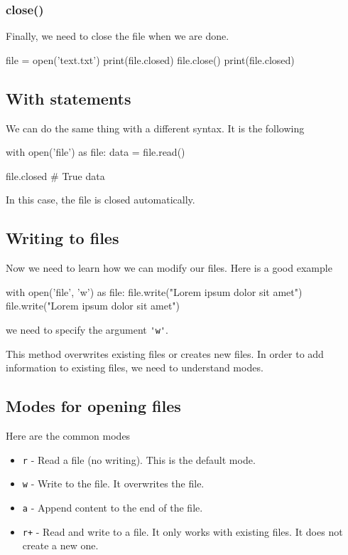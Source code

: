 \subsubsection{close()} Finally, we need to close the file when we are done. 
\begin{listing}{1}
file = open('text.txt')
print(file.closed)
file.close()
print(file.closed)    
\end{listing}

\subsection{With statements}

We can do the same thing with a different syntax. It is the following
\begin{listing}{1}
with open('file') as file:
    data = file.read()

file.closed # True
data
\end{listing}
In this case, the file is closed automatically. 

\subsection{Writing to files} Now we need to learn how we can modify our files. Here is a good example 
\begin{listing}{1}
with open('file', 'w') as file:
    file.write("Lorem ipsum dolor sit amet\n")
    file.write("Lorem ipsum dolor sit amet")
\end{listing}
we need to specify the argument \verb|'w'|. 

This method overwrites existing files or creates new files. In order to add information to existing files, we need to understand modes. 

\subsection{Modes for opening files} Here are the common modes

\begin{itemize}
    \item \verb|r| - Read a file (no writing). This is the default mode. 
    \item \verb|w| - Write to the file. It overwrites the file.
    \item \verb|a| - Append content to the end of the file. 
    \item \verb|r+| - Read and write to a file. It only works with existing files. It does not create a new one. 
\end{itemize}

